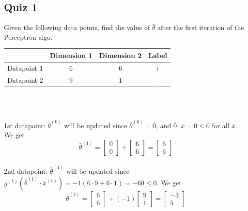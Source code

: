 \documentclass[12pt]{article}
\begin{document}
\subsection{Quiz 1}

Given the following data points, find the value of $\bar{\theta}$ after the first iteration of the Perceptron algo.\\

\begin{tabular}{lccc}
\toprule
      & Dimension 1 & Dimension 2 & Label \\
\midrule
Datapoint 1 & 6 & 6 & + \\
Datapoint 2 & 9 & 1 & - \\
\bottomrule
\end{tabular}~\\

\begin{solution}~\\
	1st datapoint: $\bar{\theta}^{(0)}$ will be updated since $\bar{\theta}^{(0)} = \bar{0}$, and $\bar{0} \cdot \bar{x} = 0 \le 0$ for all $\bar{x}$. We get
	\[
		\bar{\theta}^{(1)} = 
		\begin{bmatrix}
			0\\
			0
		\end{bmatrix} +
		\begin{bmatrix}
			6\\
			6
		\end{bmatrix} = 
		\begin{bmatrix}
			6\\
			6
		\end{bmatrix}
	\]\\

	2nd datapoint: $\bar{\theta}^{(1)}$ will be updated since $y^{(1)}(\bar{\theta}^{(1)} \cdot \bar{x}^{(1)}) = -1(6 \cdot 9 + 6 \cdot 1) = -60 \le 0$. We get
	\[
		\bar{\theta}^{(2)} = 
		\begin{bmatrix}
			6\\
			6
		\end{bmatrix} + 
		(-1)\begin{bmatrix}
			9\\
			1
		\end{bmatrix} = 
		\begin{bmatrix}
			-3\\
			5
		\end{bmatrix}
	\]\\

\end{solution}
\end{document}
